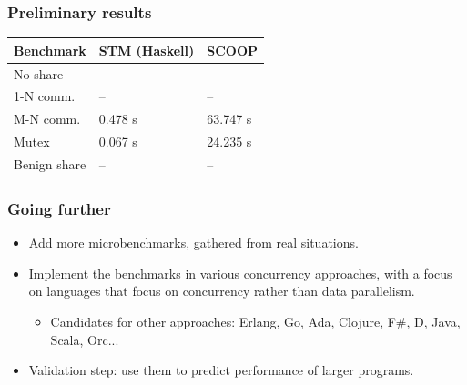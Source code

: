 \documentclass{beamer}
\begin{document}
\begin{frame}
  \frametitle{Preliminary results}

  \begin{center}
    \begin{tabular}[h]{l|l|l}
      Benchmark    & STM (Haskell) & SCOOP \\ \hline
      No share     &     --        &--     \\
      1-N comm.    &       --      &  --   \\
      M-N comm.    & 0.478 s       & 63.747 s \\
      Mutex        & 0.067 s       & 24.235 s \\
      Benign share &        --     &   --  \\
    \end{tabular}
  \end{center}
\end{frame}

\begin{frame}
  \frametitle{Going further}
  \begin{itemize}
  \item Add more microbenchmarks, gathered from real situations.
  \item Implement the benchmarks in various concurrency approaches,
    with a focus on languages that focus on concurrency rather than
    data parallelism.
    \begin{itemize}
      \item Candidates for other approaches: Erlang, Go, Ada, Clojure, F\#, D, Java, Scala, Orc...
    \end{itemize}
  \item Validation step: use them to predict performance of larger programs.
  \end{itemize}
\end{frame}
\end{document}
